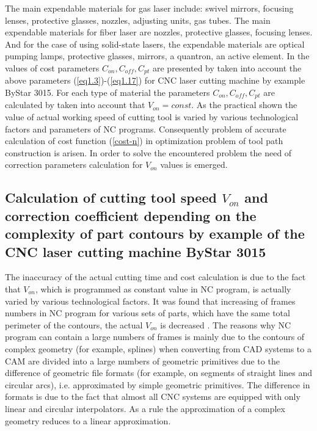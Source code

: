 \documentclass[runningheads]{llncs}
\begin{document}
The main expendable materials for gas laser include:
swivel mirrors, focusing lenses, protective glasses, nozzles, adjusting units, gas tubes.
The main expendable materials for fiber laser are nozzles, protective glasses, focusing lenses.
And for the case of using solid-state lasers,
the expendable materials are
optical pumping lamps, protective glasses, mirrors, a quantron, an active element.
In \cite{ru14} the values of cost parameters
$C_{on}, C_{off}, C_{pt}$
are presented by taken into account the above parameters (\ref{eq1.3})-(\ref{eq1.17})
for CNC laser cutting machine by example ByStar 3015.
For each type of material the parameters $C_{on}, C_{off}, C_{pt}$
are calculated by taken into account that
$V_{on}=const$.
As the practical shown \cite{ru09,Tavaeva2015Nov}
the value of actual working speed of cutting tool
is varied by various technological factors and parameters of NC programs.
Consequently problem of accurate calculation of cost function (\ref{cost-n})
in optimization problem of tool path construction is arisen.
In order to solve the encountered problem
the need of correction parameters calculation for $V_{on}$
values is emerged.

\subsection{Calculation of cutting tool speed $V_{on}$
and correction coefficient depending on the complexity of
part contours by example of the CNC laser cutting machine ByStar 3015}

The inaccuracy of the actual cutting time and cost calculation is due to the fact that $V_{on}$,
which is programmed as constant value in NC program,
is actually varied by various technological factors.
It was found that increasing of frames numbers in NC program
for various sets of parts,
which have the same total perimeter of the contours,
the actual $V_{on}$ is decreased \cite{ru09,Tavaeva2015Nov}.
The reasons why NC program can contain a large numbers of frames
is mainly due to the contours of complex geometry (for example, splines)
when converting from CAD systems to a CAM
are divided into a large numbers of geometric primitives
due to the difference of geometric file formats
(for example, on segments of straight lines and circular arcs),
i.e. approximated by simple geometric primitives.
The difference in formats is due to the fact that
almost all CNC systems are equipped with only linear and circular interpolators.
As a rule the approximation of a complex geometry reduces to a linear approximation.
\end{document}
